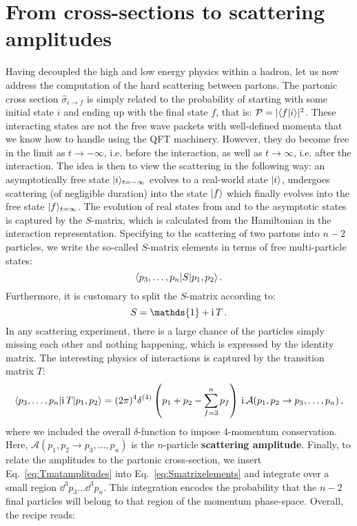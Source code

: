 \documentclass[main.tex]{subfiles}
\begin{document}
\section{From cross-sections to scattering amplitudes}
Having decoupled the high and low energy physics within a hadron, let us now address the computation of the hard scattering between partons. The partonic cross section $\hat{\sigma}_{i\rightarrow f}$ is simply related to the probability of starting with some initial state $i$ and ending up with the final state $f$, that is: $\mathcal{P} = |\langle f|i \rangle|^2$. These interacting states are not the free wave packets with well-defined momenta that we know how to handle using the QFT machinery. However, they do become free in the limit as $t\rightarrow -\infty$, i.e. before the interaction, as well as $t \rightarrow \infty$, i.e. after the interaction. The idea is then to view the scattering in the following way: an asymptotically free state $|i \rangle_{t=-\infty}$ evolves to a real-world state $|i \rangle$, undergoes scattering (of negligible duration) into the state $|f \rangle$ which finally evolves into the free state $|f \rangle_{t=\infty}$. The evolution of real states from and to the asymptotic states is captured by the $S$-matrix, which is calculated from the Hamiltonian in the interaction representation. Specifying to the scattering of two partons into $n-2$ particles, we write the so-called $S$-matrix elements in terms of free multi-particle states:
\begin{equation} \label{eq:Smatrixelements}
    \langle p_3, \ldots, p_n|S|p_1,p_2 \rangle\,.
\end{equation}
Furthermore, it is customary to split the $S$-matrix according to:
\begin{equation} \label{eq:StoiT}
    S = \mathds{1} + \i T\,.
\end{equation}
In any scattering experiment, there is a large chance of the particles simply missing each other and nothing happening, which is expressed by the identity matrix. The interesting physics of interactions is captured by the transition matrix $T$:
\begin{equation} \label{eq:Tmatamplitudes}
    \langle p_3, \ldots, p_n|\mathrm{i}\, T|p_1,p_2 \rangle = (2\pi)^4 \delta^{(4)}\left(p_1+p_2 - \sum_{f=3}^n p_f\right)\, \mathrm{i}\, \mathcal{A} (p_1,p_2 \rightarrow p_3, \ldots, p_n) \,,
\end{equation}
where we included the overall $\delta$-function to impose 4-momentum conservation. Here, $\mathcal{A} (p_1,p_2 \rightarrow p_3, \ldots, p_n)$ is the $n$-particle \textbf{scattering amplitude}. Finally, to relate the amplitudes to the partonic cross-section, we insert Eq.~\ref{eq:Tmatamplitudes} into Eq.~\ref{eq:Smatrixelements} and integrate over a small region $\dd^3p_3 \ldots \dd^3 p_n$. This integration encodes the probability that the $n-2$ final particles will belong to that region of the momentum phase-space. Overall, the recipe reads:
\end{document}
